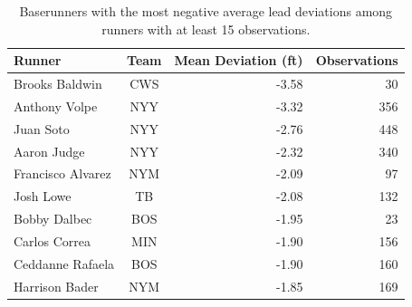 \begin{table}[!htbp]
\centering
\small
\caption{Baserunners with the most negative average lead deviations among runners with at least 15 observations.}
\label{tab:runners_conservative}

\begin{tabular}{lcrr}
\toprule
Runner & Team & Mean Deviation (ft) & Observations\\
\midrule
Brooks Baldwin & CWS & -3.58 & 30\\
Anthony Volpe & NYY & -3.32 & 356\\
Juan Soto & NYY & -2.76 & 448\\
Aaron Judge & NYY & -2.32 & 340\\
Francisco Alvarez & NYM & -2.09 & 97\\
Josh Lowe & TB & -2.08 & 132\\
Bobby Dalbec & BOS & -1.95 & 23\\
Carlos Correa & MIN & -1.90 & 156\\
Ceddanne Rafaela & BOS & -1.90 & 160\\
Harrison Bader & NYM & -1.85 & 169\\
\bottomrule
\end{tabular}
\end{table}

